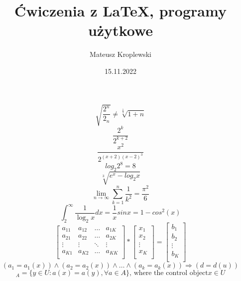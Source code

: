 \documentclass[12pt, a4paper]{article}
\title{Ćwiczenia z LaTeX, programy użytkowe}
\author{Mateusz Kroplewski}
\date{15.11.2022}
\begin{document}
\begin{equation}
 \sqrt{ \frac{2^{n}}{2_n}} \neq \sqrt[\frac{1}{3}]{1+n}
\end{equation}
\begin{equation}
	\frac{2^{k}}{2^{k+2}}
\end{equation}
\begin{equation}
\frac{x^{2}}{2^{(x+2)(x-2)^{3}}}
\end{equation}
\begin{equation}
log_2 2^8 = 8	
\end{equation}
\begin{equation}
\sqrt[3]{e^x - log_2 x}
\end{equation}
\begin{equation}
\lim_{n \rightarrow \infty} \sum_{k=1}^{n} \frac{1}{k^2} = \frac{\pi^2}{6}
\end{equation}
\begin{equation}
\int_{2}^{\infty} \frac{1}{\log_{2}x}dx  = \frac{1}{x}sin x = 1 - cos^{2}(x)
\end{equation}
\begin{equation}
\left[
\begin{array}{cccc}
a_{11} & a_{12} & \ldots & a_{1K} \\
a_{21} & a_{22} & \ldots & a_{2K} \\
\vdots & \vdots & \ddots & \vdots \\
a_{K1} & a_{K2} & \ldots & a_{KK} \\
\end{array}
\right]
*
\left[
\begin{array}{c}
x_1 \\
x_2 \\
\vdots \\
x_K \\
\end{array}
\right]
=
\left[
\begin{array}{c}
b_1 \\
b_2 \\
\vdots \\
b_K \\
\end{array}
\right]
\end{equation}
\begin{equation}
(a_1 = a_{1}(x)) \wedge (a_2 = a_{2}(x)) \wedge \ldots \wedge (a_k = a_{k}(x)) \Rightarrow (d = d(u))
\end{equation}
\begin{equation}
[x]_{A} = \lbrace y \in U : a(x) = a(y), \forall a \in A \rbrace \textrm{, where the control object} x \in U
\end{equation}
\end{document}

